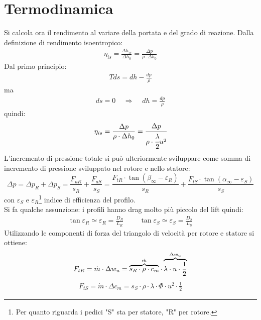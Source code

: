 \section{Termodinamica}
Si calcola ora il rendimento al variare della portata e del grado di reazione. Dalla definizione di rendimento isoentropico:
\begin{align*}
\eta_{is} = \frac{\Delta h_{is}}{\Delta h_0} = \frac{\Delta p}{\rho \cdot \Delta h_0}
\end{align*}
Dal primo principio:
\begin{align*}
T ds = dh - \frac{dp}{\rho}
\end{align*}
ma
\begin{align*}
ds = 0 \;\;\;\; \Rightarrow \;\;\;\; dh = \frac{dp}{\rho}
\end{align*}
quindi:
\begin{equation}\label{eq:etadp}
\eta_{is} = \frac{\Delta p}{\rho \cdot \Delta h_0} = \cfrac{\Delta p}{\rho \cdot \cfrac{\lambda}{2} u^2}
\end{equation}
L'incremento di pressione totale si può ulteriormente sviluppare come somma di incremento di pressione sviluppato nel rotore e nello statore:
\begin{equation}
\Delta p = \Delta p_R + \Delta p_S = \frac{F_{aR}}{s_R} + \frac{F_{aS}}{s_S} = \frac{F_{tR} \cdot \tan(\beta_{\infty} - \varepsilon_R)}{s_R} + \frac{F_{tS} \cdot \tan(\alpha_{\infty} - \varepsilon_S)}{s_S}
\label{eq:deltap}
\end{equation}
con $\varepsilon_S$ e $\varepsilon_R$\footnote{Per quanto riguarda i pedici "S" sta per statore, "R" per rotore.} indice di efficienza del profilo.\\
Si fa qualche assunzione: i profili hanno drag molto più piccolo del lift quindi:
\begin{align*}
\tan \varepsilon_R \simeq \varepsilon_R = \frac{D_R}{L_R} \;\;\;\;\;\;\;\; \tan \varepsilon_S \simeq \varepsilon_S = \frac{D_S}{L_S}
\end{align*}
Utilizzando le componenti di forza del triangolo di velocità per rotore e statore si ottiene:
\begin{align*}
F_{tR} = \dot{m} \cdot \Delta w_u = \overbrace{s_R \cdot \rho \cdot c_m}^\text{$ \dot{m} $} \cdot \overbrace{\lambda \cdot u \cdot \frac{1}{2}}^\text{$\Delta w_u$}  
\end{align*}
\begin{align*}
F_{tS} = \dot{m} \cdot \Delta c_m = s_S \cdot \rho \cdot \lambda \cdot \Phi \cdot u^2 \cdot \frac{1}{2}
\end{align*}
